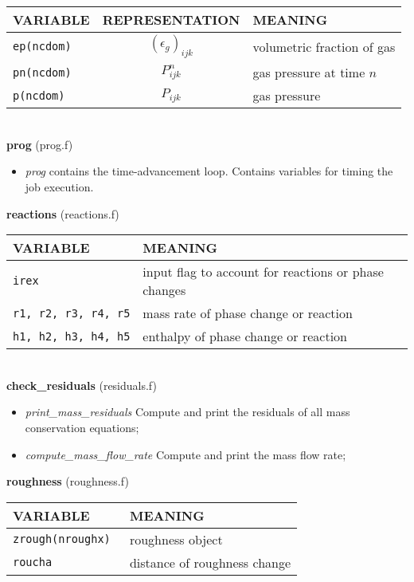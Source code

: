\begin{tabular}{|p{6cm}|c|p{6cm}|}\hline
VARIABLE & REPRESENTATION & MEANING\\\hline
\tt ep(ncdom) & $(\epsilon_g)_{ijk}$ &  volumetric fraction of gas\\\hline
\tt pn(ncdom) & $P_{ijk}^{n}$ &  gas pressure at time $n$\\\hline
\tt p(ncdom) & $P_{ijk}$ &  gas pressure\\\hline
\end{tabular}\\[5mm]
%
%
{\large{\bf prog}} (prog.f)\\[5mm]
\begin{itemize}
\item {\em prog} contains the time-advancement loop. Contains variables for timing the job execution.
\end{itemize}
%
%
{\large{\bf reactions}} (reactions.f)\\[5mm]
\begin{tabular}{|p{6cm}|p{6cm}|}\hline
VARIABLE & MEANING\\\hline
\tt irex & input flag to account for reactions or phase changes\\\hline 
\tt r1, r2, r3, r4, r5 & mass rate of phase change or reaction\\\hline
\tt h1, h2, h3, h4, h5 & enthalpy of phase change or reaction\\\hline
\end{tabular}\\[5mm]
%
%
{\large{\bf check\_residuals}} (residuals.f)\\
\begin{itemize}
\item {\em print\_mass\_residuals} Compute and print the residuals of all mass conservation equations;
\item {\em compute\_mass\_flow\_rate} Compute and print the mass flow rate;
\end{itemize}
%
%
{\large{\bf roughness}} (roughness.f)\\[5mm]
\begin{tabular}{|p{6cm}|p{6cm}|}\hline
VARIABLE & MEANING\\\hline
\tt zrough(nroughx) & roughness object\\\hline
\tt roucha & distance of roughness change\\\hline
\end{tabular}\\[5mm]
